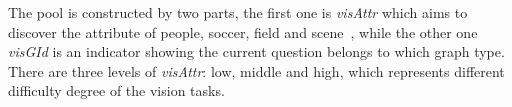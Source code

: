The pool is constructed by two parts, the first one is \textit{visAttr} which aims to discover the attribute of people, soccer, field and scene~\cite{peixi2019}, while the other one \textit{visGId} is an indicator showing the current question belongs to which graph type. There are three levels of \textit{visAttr}: low, middle and high, which represents different difficulty degree of the vision tasks. 


